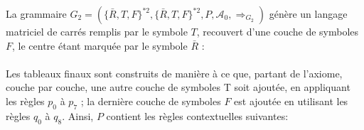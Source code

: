 \documentclass[12pt]{article}
\theoremstyle{definition}
\begin{document}
	La grammaire $G_{2} = (\{\bar{R}, T , F\}^{*2} ,\{\bar{R}, T , F\}^{*2}, P, \mathcal{A}_{0}, \Longrightarrow_{G_{2}} )$ génère un langage matriciel de carrés remplis par le symbole $T$, recouvert d'une couche de symboles $F$, le centre étant marquée par le symbole $\bar{R}$ : \\

\begingroup
{} \\
\endgroup
\vspace{5mm}
Les tableaux finaux sont construits de manière à ce que, partant de l'axiome, couche par couche, une autre couche de symboles T soit ajoutée, en appliquant les règles $p_{0}$ à $p_{7}$ ; la dernière couche de symboles $F$ est ajoutée en utilisant les règles $q_{0}$ à $q_{8}$. Ainsi, $P$ contient les règles contextuelles suivantes: \\
\end{document}
